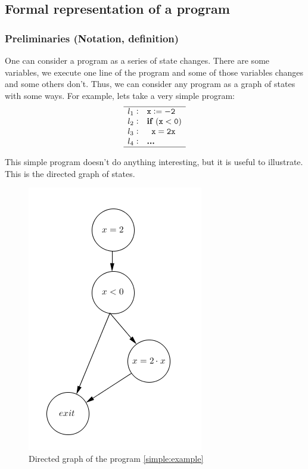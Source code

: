 \subsection{Formal representation of a program}

\subsubsection{Preliminaries (Notation, definition)}

One can consider a program as a series of state changes. There are some variables, we execute one line of the program and some of those variables changes and some others don't. Thus, we can consider any program as a graph of states with some ways. For example, lets take a very simple program:
%
\[
	\begin{array}{l@{\hspace{0.3em}}c@{\hspace{1em}}l}
	\hline
		l_1 & : & \mathtt{x := -2} \\
		l_2 & : & \mathtt{\textbf{if } (x<0)} \\
		l_3 & : & \mathtt{\;\;x = 2x} \\
		l_4 & : & \mathtt{\textbf{...}}\\
	\hline
	\end{array}
\]
\label{simple:example}

This simple program doesn't do anything interesting, but it is useful to illustrate. This is the directed graph of states.

\begin{figure}[hbtp]
\centering
\includegraphics[scale=0.6]{graphics/simpleExample.png}
\caption{Directed graph of the program \ref{simple:example}}
\end{figure}


